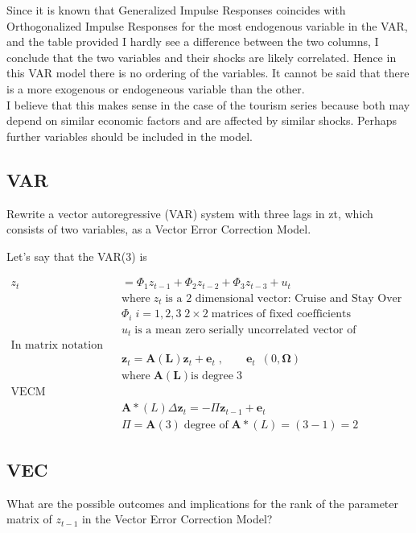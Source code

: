 \documentclass[11pt]{article}
\begin{document}
Since it is known that Generalized Impulse Responses coincides with Orthogonalized Impulse Responses for the most endogenous variable in the VAR, and the table provided I hardly see a difference between the two columns, I conclude that the two variables and their shocks are likely correlated. Hence in this VAR model there is no ordering of the variables. It cannot be said that there is a more exogenous or endogeneous variable than the other.\\
I believe that this makes sense in the case of the tourism series because both may depend on similar economic factors and are affected by similar shocks. Perhaps further variables should be included in the model.


\subsection{VAR}
Rewrite a vector autoregressive (VAR) system with three lags in zt, which consists of two variables, as a Vector Error Correction Model.

Let's say that the VAR(3) is

\begin{align*}
 z_{t} & = \Phi_1 z_{t-1} + \Phi_2 z_{t-2} +\Phi_3 z_{t-3} + u_t \\
  & \text{where} \; z_t \; \text{is a 2 dimensional vector: Cruise and Stay Over} \\
 &  \Phi_i \; i=1,2,3 \; 2\times 2 \; \text{matrices of fixed coefficients}\\
  &  u_t \; \text{is a mean zero serially uncorrelated vector of disturbances} \\
\text{In matrix notation} & \\
  & \mathbf{z}_t=\mathbf{A(L)} \mathbf{z}_t + \mathbf{e}_t \; , \qquad
 \mathbf{e}_t ~ \; (0, \mathbf{\Omega})  \\
 & \text{where} \; \mathbf{A(L)} \text{is degree} \; 3 \\
 \text{VECM representation} & \\
 & \mathbf{A}*(L)\Delta \mathbf{z}_t = - \Pi \mathbf{z}_{t-1} + \mathbf{e}_t\\
 & \Pi = \mathbf{A}(3) \; \text{degree of} \; \mathbf{A}*(L)=(3-1)=2
 \end{align*}
 

\subsection{VEC}
What are the possible outcomes and implications for the rank of the parameter matrix of $z_{t-1}$ in the Vector Error Correction Model?\\
\end{document}

